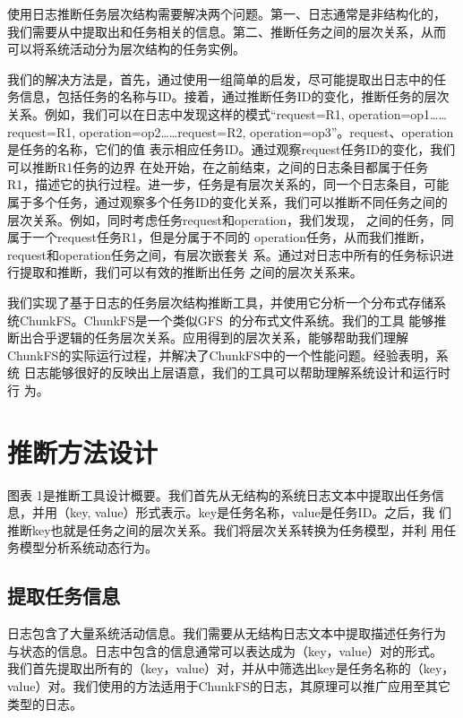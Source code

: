 使用日志推断任务层次结构需要解决两个问题。第一、日志通常是非结构化的，
我们需要从中提取出和任务相关的信息。第二、推断任务之间的层次关系，从而
可以将系统活动分为层次结构的任务实例。

我们的解决方法是，首先，通过使用一组简单的启发，尽可能提取出日志中的任
务信息，包括任务的名称与ID。接着，通过推断任务ID的变化，推断任务的层次
关系。例如，我们可以在日志中发现这样的模式“request=R1,
operation=op1\ldots \ldots request=R1,
operation=op2\ldots \ldots request=R2,
operation=op3”。request、operation是任务的名称，它们的值
表示相应任务ID。通过观察request任务ID的变化，我们可以推断R1任务的边界
在处开始，在之前结束，之间的日志条目都属于任务
R1，描述它的执行过程。进一步，任务是有层次关系的，同一个日志条目，可能
属于多个任务，通过观察多个任务ID的变化关系，我们可以推断不同任务之间的
层次关系。例如，同时考虑任务request和operation，我们发现，
之间的任务，同属于一个request任务R1，但是分属于不同的
operation任务，从而我们推断，request和operation任务之间，有层次嵌套关
系。通过对日志中所有的任务标识进行提取和推断，我们可以有效的推断出任务
之间的层次关系来。

我们实现了基于日志的任务层次结构推断工具，并使用它分析一个分布式存储系
统ChunkFS。ChunkFS是一个类似GFS~\cite{gfs}的分布式文件系统。我们的工具
能够推断出合乎逻辑的任务层次关系。应用得到的层次关系，能够帮助我们理解
ChunkFS的实际运行过程，并解决了ChunkFS中的一个性能问题。经验表明，系统
日志能够很好的反映出上层语意，我们的工具可以帮助理解系统设计和运行时行
为。


\section{推断方法设计}

图表 1是推断工具设计概要。我们首先从无结构的系统日志文本中提取出任务信
息，并用（key, value）形式表示。key是任务名称，value是任务ID。之后，我
们推断key也就是任务之间的层次关系。我们将层次关系转换为任务模型，并利
用任务模型分析系统动态行为。

\subsection{提取任务信息}

日志包含了大量系统活动信息。我们需要从无结构日志文本中提取描述任务行为
与状态的信息。日志中包含的信息通常可以表达成为（key，value）对的形式。
我们首先提取出所有的（key，value）对，并从中筛选出key是任务名称的（key，
value）对。我们使用的方法适用于ChunkFS的日志，其原理可以推广应用至其它
类型的日志。

